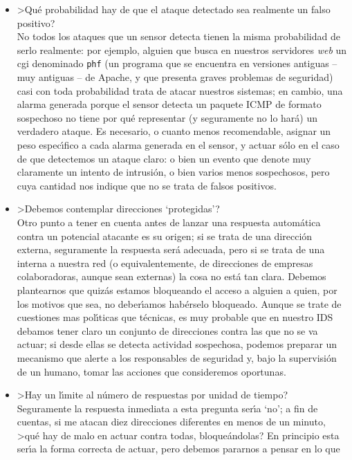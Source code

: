 \begin{itemize}
\item >Qu\'e probabilidad hay de que el ataque detectado sea realmente un falso
positivo?\\
No todos los ataques que un sensor detecta tienen la misma probabilidad de
serlo realmente: por ejemplo, alguien que busca en nuestros servidores {\it 
web} un {\sc cgi} denominado {\tt phf} (un programa que se encuentra en 
versiones antiguas -- muy antiguas -- de Apache, y que presenta graves 
problemas de seguridad) casi con toda probabilidad trata de atacar nuestros
sistemas; en cambio, una alarma generada porque el sensor detecta un paquete
ICMP de formato sospechoso no tiene por qu\'e representar (y seguramente no lo
har\'a) un verdadero ataque. Es necesario, o cuanto menos recomendable, asignar
un peso espec\'{\i}fico a cada alarma generada en el sensor, y actuar s\'olo
en el caso de que detectemos un ataque claro: o bien un evento que denote muy 
claramente un intento de intrusi\'on, o bien varios menos sospechosos, pero
cuya cantidad nos indique que no se trata de falsos positivos.
\item >Debemos contemplar direcciones `protegidas'?\\
Otro punto a tener en cuenta antes de lanzar una respuesta autom\'atica contra
un potencial atacante es su origen; si se trata de una direcci\'on externa, 
seguramente la respuesta ser\'a adecuada, pero si se trata de una interna a
nuestra red (o equivalentemente, de direcciones de empresas colaboradoras, 
aunque sean externas) la cosa no est\'a tan clara. Debemos plantearnos que
quiz\'as estamos bloqueando el acceso a alguien a quien, por los motivos que
sea, no deber\'{\i}amos hab\'erselo bloqueado. Aunque se trate de cuestiones
mas pol\'{\i}ticas que t\'ecnicas, es muy probable que en nuestro IDS debamos 
tener claro un conjunto de direcciones contra las que no se va actuar; si desde
ellas se detecta actividad sospechosa, podemos preparar un mecanismo que alerte
a los responsables de seguridad y, bajo la supervisi\'on de un humano, tomar 
las acciones que consideremos oportunas.
\item >Hay un l\'{\i}mite al n\'umero de respuestas por unidad de tiempo?\\
Seguramente la respuesta inmediata a esta pregunta ser\'{\i}a `no'; a fin de
cuentas, si me atacan diez direcciones diferentes en menos de un minuto, >qu\'e
hay de malo en actuar contra todas, bloque\'andolas? En principio esta 
ser\'{\i}a la forma correcta de actuar, pero debemos pararnos a pensar en lo que

\end{itemize}
